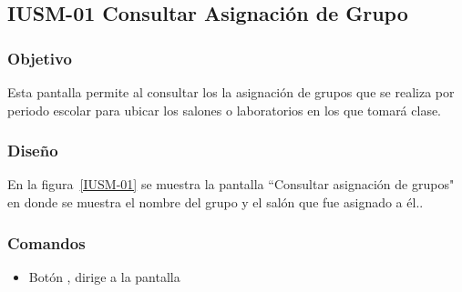 \subsection{IUSM-01 Consultar Asignación de Grupo}

\subsubsection{Objetivo}

	
    Esta pantalla permite al  consultar los la asignación de grupos que se realiza por periodo escolar para ubicar los salones o laboratorios en los que tomará clase.
\subsubsection{Diseño}


    En la figura~\ref{IUSM-01} se muestra la pantalla ``Consultar asignación de grupos" en donde se muestra el nombre del grupo y el salón que fue asignado a él..
    



\subsubsection{Comandos}
    \begin{itemize}

	\item Botón , dirige a la pantalla 
    \end{itemize}
